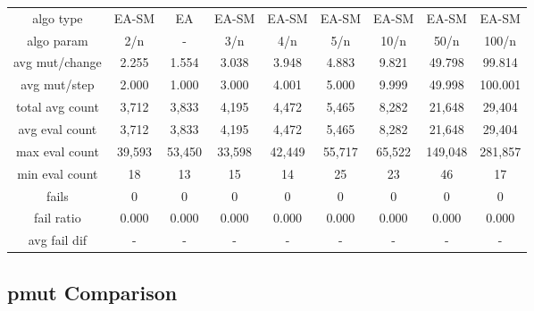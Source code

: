 \begin{tabular}[h]{ccccccccc}
algo type&          EA-SM&      EA&   EA-SM&   EA-SM&   EA-SM&   EA-SM&   EA-SM&   EA-SM\\
algo param&           2/n&       -&     3/n&     4/n&     5/n&    10/n&    50/n&   100/n\\
avg mut/change&     2.255&   1.554&   3.038&   3.948&   4.883&   9.821&  49.798&  99.814\\
avg mut/step&       2.000&   1.000&   3.000&   4.001&   5.000&   9.999&  49.998& 100.001\\
\hline
total avg count&    3,712&   3,833&   4,195&   4,472&   5,465&   8,282&  21,648&  29,404\\
avg eval count&     3,712&   3,833&   4,195&   4,472&   5,465&   8,282&  21,648&  29,404\\
max eval count&    39,593&  53,450&  33,598&  42,449&  55,717&  65,522& 149,048& 281,857\\
min eval count&        18&      13&      15&      14&      25&      23&      46&      17\\
\hline
fails&                  0&       0&       0&       0&       0&       0&       0&       0\\
fail ratio&         0.000&   0.000&   0.000&   0.000&   0.000&   0.000&   0.000&   0.000\\
avg fail dif&           -&       -&       -&       -&       -&       -&       -&       -\\
\end{tabular}


\subsection{pmut Comparison}


